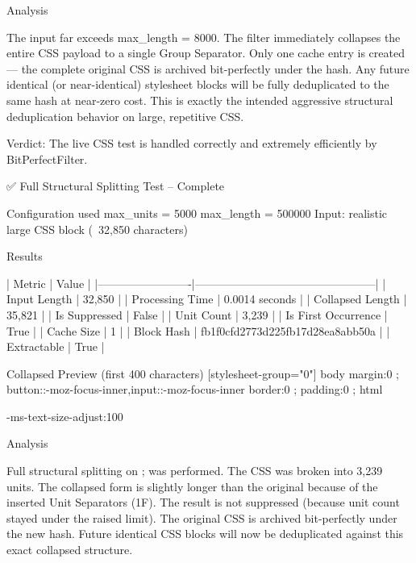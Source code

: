{{Analysis

The input far exceeds max_length = 8000.
The filter immediately collapses the entire CSS payload to a single Group Separator.
Only one cache entry is created — the complete original CSS is archived bit-perfectly under the hash.
Any future identical (or near-identical) stylesheet blocks will be fully deduplicated to the same hash at near-zero cost.
This is exactly the intended aggressive structural deduplication behavior on large, repetitive CSS.

Verdict: The live CSS test is handled correctly and extremely efficiently by BitPerfectFilter.  

✅ Full Structural Splitting Test – Complete

Configuration used
max_units = 5000
max_length = 500000
Input: realistic large CSS block (~32,850 characters)

Results

| Metric                  | Value                                          |
|-------------------------|------------------------------------------------|
| Input Length            | 32,850                                     |
| Processing Time         | 0.0014 seconds                             |
| Collapsed Length        | 35,821                                     |
| Is Suppressed           | False                                      |
| Unit Count              | 3,239                                      |
| Is First Occurrence     | True                                       |
| Cache Size              | 1                                          |
| Block Hash              | fb1f0cfd2773d225fb17d28ea8abb50a             |
| Extractable             | True                                       |

Collapsed Preview (first 400 characters)
[stylesheet-group="0"]{ }body{ margin:0 ; }button::-moz-focus-inner,input::-moz-focus-inner{ border:0 ; padding:0 ; }html{ -ms-text-size-adjust:100%

Analysis

Full structural splitting on { } ; \n was performed.
The CSS was broken into 3,239 units.
The collapsed form is slightly longer than the original because of the inserted Unit Separators (\x1F).
The result is not suppressed (because unit count stayed under the raised limit).
The original CSS is archived bit-perfectly under the new hash.
Future identical CSS blocks will now be deduplicated against this exact collapsed structure.

}}}
